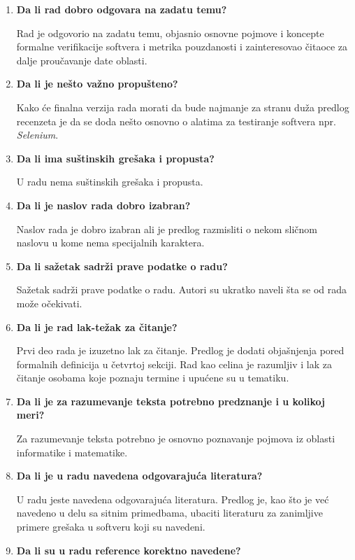 \documentclass[a4paper]{report}
\begin{document}
\begin{enumerate}
\item \textbf{Da li rad dobro odgovara na zadatu temu?}

Rad je odgovorio na zadatu temu, objasnio osnovne pojmove i koncepte formalne verifikacije softvera i metrika pouzdanosti i zainteresovao čitaoce za dalje proučavanje date oblasti.\\
\item \textbf{Da li je nešto važno propušteno?}

Kako će finalna verzija rada morati da bude najmanje za stranu duža predlog recenzeta je da se doda nešto osnovno o alatima za testiranje softvera npr. \textit{Selenium}.\\
\item \textbf{Da li ima suštinskih grešaka i propusta?}

U radu nema suštinskih grešaka i propusta.\\
\item \textbf{Da li je naslov rada dobro izabran?}

Naslov rada je dobro izabran ali je predlog razmisliti o nekom sličnom naslovu u kome nema specijalnih karaktera.\\
\item \textbf{Da li sažetak sadrži prave podatke o radu?}

Sažetak sadrži prave podatke o radu. Autori su ukratko naveli šta se od rada može očekivati.\\
\item \textbf{Da li je rad lak-težak za čitanje?}

Prvi deo rada je izuzetno lak za čitanje. Predlog je dodati objašnjenja pored formalnih definicija u četvrtoj sekciji. Rad kao celina je razumljiv i lak za čitanje osobama koje poznaju termine i upućene su u tematiku.\\
\item \textbf{Da li je za razumevanje teksta potrebno predznanje i u kolikoj meri?}

Za razumevanje teksta potrebno je osnovno poznavanje pojmova iz oblasti informatike i matematike.\\
\item \textbf{Da li je u radu navedena odgovarajuća literatura?}

U radu jeste navedena odgovarajuća literatura. Predlog je, kao što je već navedeno u delu sa sitnim primedbama, ubaciti literaturu za zanimljive primere grešaka u softveru koji su navedeni.\\
\item \textbf{Da li su u radu reference korektno navedene?}


\end{enumerate}
\end{document}
